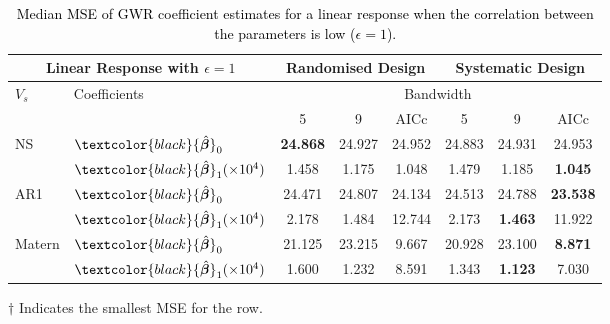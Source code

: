 \documentclass[a4paper]{article} 	%
\newcommand{\zc}[1]{\textcolor{black}{#1}}
\begin{document}
\begin{table}[!htp]
\centering
\begin{threeparttable}
\caption{\zc{Median MSE of GWR coefficient estimates for a linear response when the correlation between the parameters is low ($\epsilon=1$).}}\label{tb:MSElinear}
\begin{tabular}{ll|ccc|ccc}
\toprule
\multicolumn{2}{c}{Linear Response with $\epsilon=1$} & \multicolumn{3}{c}{Randomised Design} & \multicolumn{3}{c}{Systematic Design} \\ \midrule
\multirow{2}{*}{$V_s$} & \multirow{2}{*}{Coefficients}  & \multicolumn{6}{c}{Bandwidth}\\ 
&  & 5  & 9  & AICc & 5  & 9  & AICc \\ \midrule
\multirow{2}{*}{NS} & $\zc{\hat{\bm{\beta}}}_0$ & \bf{24.868}\tnote{$\dagger$}  & 24.927   & 24.952   & 24.883     & 24.931     & 24.953 \\
  &$\zc{\hat{\bm{\beta}}}_1 (\times 10^4)$ & 1.458   & 1.175   & 1.048 & 1.479    & 1.185   & \bf{1.045}\tnote{$\dagger$}   \\ \midrule
\multirow{2}{*}{AR1}& $\zc{\hat{\bm{\beta}}}_0$ & 24.471  & 24.807   & 24.134   & 24.513      & 24.788    & \bf{23.538}\tnote{$\dagger$}  \\
     & $\zc{\hat{\bm{\beta}}}_1 (\times 10^4)$ & 2.178   & 1.484    & 12.744     & 2.173    & \bf{1.463}\tnote{$\dagger$}     & 11.922  \\ \midrule
\multirow{2}{*}{Matern} & $\zc{\hat{\bm{\beta}}}_0$ & 21.125  & 23.215   & 9.667      & 20.928     & 23.100    & \bf{8.871}\tnote{$\dagger$} \\
      & $\zc{\hat{\bm{\beta}}}_1 (\times 10^4)$& 1.600   & 1.232    & 8.591      & 1.343     & \bf{1.123}\tnote{$\dagger$}  & 7.030   \\ 
\bottomrule
\end{tabular}
\begin{tablenotes}
\item[$\dagger$] \footnotesize Indicates the smallest MSE for the row.
\end{tablenotes}
\end{threeparttable}
\end{table}
\end{document}
